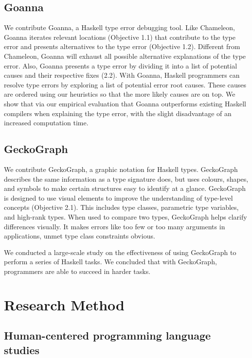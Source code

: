 \subsection{Goanna}
We contribute Goanna, a Haskell type error debugging tool. Like Chameleon, Goanna iterates relevant locations (Objective 1.1) that contribute to the type error and presents alternatives to the type error (Objective 1.2). Different from Chameleon, Goanna will exhaust all possible alternative explanations of the type error. Also, Goanna presents a type error by dividing it into a list of potential causes and their respective fixes (2.2). With Goanna, Haskell programmers can resolve type errors by exploring a list of potential error root causes. These causes are ordered using our heuristics so that the more likely causes are on top. We show that via our empirical evaluation that Goanna outperforms existing Haskell compilers when explaining the type error, with the slight disadvantage of an increased computation time.

\subsection{GeckoGraph}

We contribute GeckoGraph, a graphic notation for Haskell types. GeckoGraph describes the same information as a type signature does, but uses colours, shapes, and symbols to make certain structures easy to identify at a glance. GeckoGraph is designed to use visual elements to improve the understanding of type-level concepts (Objective 2.1). This includes type classes, parametric type variables, and high-rank types. When used to compare two types, GeckoGraph helps clarify differences visually. It makes errors like too few or too many arguments in applications, unmet type class constraints obvious.


We conducted a large-scale study on the effectiveness of using GeckoGraph to perform a series of Haskell tasks. We concluded that with GeckoGraph, programmers are able to succeed in harder tasks.

\section{Research Method}

\subsection{Human-centered programming language studies}

